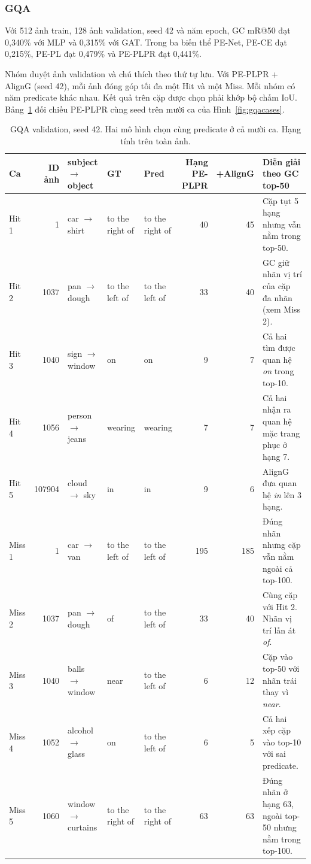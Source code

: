 \subsubsection{GQA}\label{app:gqacases}
Với 512 ảnh train, 128 ảnh validation, seed 42 và năm epoch, GC mR@50 đạt
0,340\% với MLP và 0,315\% với GAT. Trong ba biến thể PE-Net, PE-CE đạt
0,215\%, PE-PL đạt 0,479\% và PE-PLPR đạt 0,441\%.

Nhóm duyệt ảnh validation và chú thích theo thứ tự lưu. Với PE-PLPR + AlignG (seed 42), mỗi ảnh đóng góp tối đa
một Hit và một Miss. Mỗi nhóm có năm predicate khác nhau. Kết quả trên cặp được chọn phải khớp bộ chấm IoU.
Bảng~\ref{tab:gqacases} đối chiếu PE-PLPR cùng seed trên mười ca của Hình~\ref{fig:gqacases}.

\begin{table}[H]
\centering\footnotesize
\caption{GQA validation, seed 42. Hai mô hình chọn cùng predicate ở cả mười ca. Hạng tính trên toàn ảnh.}
\label{tab:gqacases}
\setlength{\tabcolsep}{3pt}
\begin{tabularx}{\linewidth}{@{}lrlllrrX@{}}\toprule
Ca & ID ảnh & subject $\to$ object & GT & Pred & Hạng PE-PLPR & +AlignG & Diễn giải theo GC top-50\\\midrule
Hit 1 & 1 & car $\to$ shirt & to the right of & to the right of & 40 & 45 & Cặp tụt 5 hạng nhưng vẫn nằm trong top-50.\\
Hit 2 & 1037 & pan $\to$ dough & to the left of & to the left of & 33 & 40 & GC giữ nhãn vị trí của cặp đa nhãn (xem Miss 2).\\
Hit 3 & 1040 & sign $\to$ window & on & on & 9 & 7 & Cả hai tìm được quan hệ \textit{on} trong top-10.\\
Hit 4 & 1056 & person $\to$ jeans & wearing & wearing & 7 & 7 & Cả hai nhận ra quan hệ mặc trang phục ở hạng 7.\\
Hit 5 & 107904 & cloud $\to$ sky & in & in & 9 & 6 & AlignG đưa quan hệ \textit{in} lên 3 hạng.\\\midrule
Miss 1 & 1 & car $\to$ van & to the left of & to the left of & 195 & 185 & Đúng nhãn nhưng cặp vẫn nằm ngoài cả top-100.\\
Miss 2 & 1037 & pan $\to$ dough & of & to the left of & 33 & 40 & Cùng cặp với Hit 2. Nhãn vị trí lấn át \textit{of}.\\
Miss 3 & 1040 & balls $\to$ window & near & to the left of & 6 & 12 & Cặp vào top-50 với nhãn trái thay vì \textit{near}.\\
Miss 4 & 1052 & alcohol $\to$ glass & on & to the left of & 6 & 5 & Cả hai xếp cặp vào top-10 với sai predicate.\\
Miss 5 & 1060 & window $\to$ curtains & to the right of & to the right of & 63 & 63 & Đúng nhãn ở hạng 63, ngoài top-50 nhưng nằm trong top-100.\\
\bottomrule\end{tabularx}
\par{}
\end{table}


